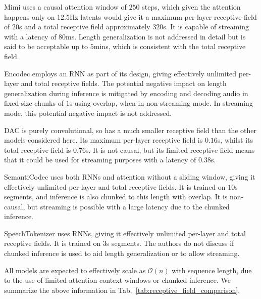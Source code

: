 \documentclass{article} %
\begin{document}
Mimi \citep{moshi} uses a causal attention window of $250$ steps, which given the attention happens only on 12.5\si{\Hz} latents would give it a maximum per-layer receptive field of $20$\si{\second} and a total receptive field approximately $320$\si{\second}. It is capable of streaming with a latency of $80$\si{\milli \second}. Length generalization is not addressed in detail but is said to be acceptable up to $5$mins, which is consistent with the total receptive field.

Encodec \citep{défossez2022high} employs an RNN as part of its design, giving effectively unlimited per-layer and total receptive fields. The potential negative impact on length generalization during inference is mitigated by encoding and decoding audio in fixed-size chunks of $1$\si{\second} using overlap, when in non-streaming mode. In streaming mode, this potential negative impact is not addressed. 

DAC \citep{kumar2023highfidelity} is purely convolutional, so has a much smaller receptive field than the other models considered here. Its maximum per-layer receptive field is $0.16$\si{\second}, whilst its total receptive field is $0.76$\si{\second}. It is not causal, but its limited receptive field means that it could be used for streaming purposes with a latency of $0.38$\si{\second}.

SemantiCodec \citep{liu2024} uses both RNNs and attention without a sliding window, giving it effectively unlimited per-layer and total receptive fields. It is trained on $10$\si{\second} segments, and inference is also chunked to this length with overlap. It is non-causal, but streaming is possible with a large latency due to the chunked inference.

SpeechTokenizer \citep{zhang2023speechtokenizer} uses RNNs, giving it effectively unlimited per-layer and total receptive fields. It is trained on 3\si{\second} segments. The authors do not discuss if chunked inference is used to aid length generalization or to allow streaming.

All models are expected to effectively scale as $\mathcal{O}(n)$ with sequence length, due to the use of limited attention context windows or chunked inference. We summarize the above information in Tab.~\ref{tab:receptive_field_comparison}.
\end{document}
